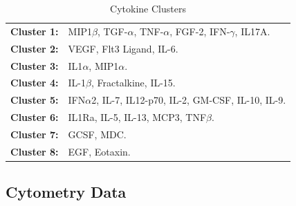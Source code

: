 \documentclass[12pt,a4paper]{report}
\begin{document}
\begin{table}[h!]
    \centering
    \begin{tabular}{ll}
        \textbf{Cluster 1:} & MIP1$\beta$, TGF-$\alpha$, TNF-$\alpha$, FGF-2, IFN-$\gamma$, IL17A. \\
        \textbf{Cluster 2:} & VEGF, Flt3 Ligand, IL-6. \\
        \textbf{Cluster 3:} & IL1$\alpha$, MIP1$\alpha$. \\
        \textbf{Cluster 4:} & IL-1$\beta$, Fractalkine, IL-15. \\
        \textbf{Cluster 5:} & IFN$\alpha$2, IL-7, IL12-p70, IL-2, GM-CSF, IL-10, IL-9. \\
        \textbf{Cluster 6:} & IL1Ra, IL-5, IL-13, MCP3, TNF$\beta$. \\
        \textbf{Cluster 7:} & GCSF, MDC. \\
        \textbf{Cluster 8:} & EGF, Eotaxin.
    \end{tabular}
    \caption{Cytokine Clusters}
    \label{tab:cytokine_clusters}
\end{table}


\subsection{Cytometry Data}
\end{document}
